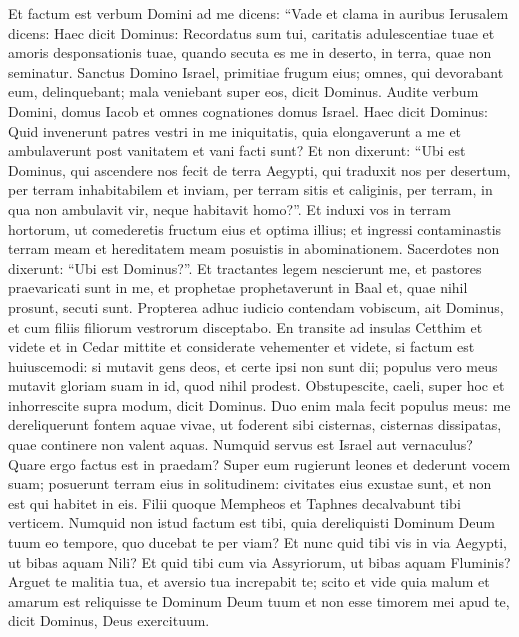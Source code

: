 \begin{biblechapter}  
\verse Et factum est verbum Domini ad me dicens: 
\verse “Vade et clama in auribus Ierusalem dicens: Haec dicit Dominus: Recordatus sum tui, caritatis adulescentiae tuae et amoris desponsationis tuae, quando secuta es me in deserto, in terra, quae non seminatur. 
\verse Sanctus Domino Israel, primitiae frugum eius; omnes, qui devorabant eum, delinquebant; mala veniebant super eos, dicit Dominus. 
\verse Audite verbum Domini, domus Iacob et omnes cognationes domus Israel. 
\verse Haec dicit Dominus: Quid invenerunt patres vestri in me iniquitatis, quia elongaverunt a me et ambulaverunt post vanitatem et vani facti sunt? 
\verse Et non dixerunt: “Ubi est Dominus, qui ascendere nos fecit de terra Aegypti, qui traduxit nos per desertum, per terram inhabitabilem et inviam, per terram sitis et caliginis, per terram, in qua non ambulavit vir, neque habitavit homo?”. 
\verse Et induxi vos in terram hortorum, ut comederetis fructum eius et optima illius; et ingressi contaminastis terram meam et hereditatem meam posuistis in abominationem. 
\verse Sacerdotes non dixerunt: “Ubi est Dominus?”. Et tractantes legem nescierunt me, et pastores praevaricati sunt in me, et prophetae prophetaverunt in Baal et, quae nihil prosunt, secuti sunt. 
\verse Propterea adhuc iudicio contendam vobiscum, ait Dominus, et cum filiis filiorum vestrorum disceptabo. 
\verse En transite ad insulas Cetthim et videte et in Cedar mittite et considerate vehementer et videte, si factum est huiuscemodi: 
\verse si mutavit gens deos, et certe ipsi non sunt dii; populus vero meus mutavit gloriam suam in id, quod nihil prodest. 
\verse Obstupescite, caeli, super hoc et inhorrescite supra modum, dicit Dominus. 
\verse Duo enim mala fecit populus meus: me dereliquerunt fontem aquae vivae, ut foderent sibi cisternas, cisternas dissipatas, quae continere non valent aquas. 
\verse Numquid servus est Israel aut vernaculus? Quare ergo factus est in praedam? Super eum rugierunt leones 
\verse et dederunt vocem suam; posuerunt terram eius in solitudinem: civitates eius exustae sunt, et non est qui habitet in eis. 
\verse Filii quoque Mempheos et Taphnes decalvabunt tibi verticem. 
\verse Numquid non istud factum est tibi, quia dereliquisti Dominum Deum tuum eo tempore, quo ducebat te per viam? 
\verse Et nunc quid tibi vis in via Aegypti, ut bibas aquam Nili? Et quid tibi cum via Assyriorum, ut bibas aquam Fluminis? 
\verse Arguet te malitia tua, et aversio tua increpabit te; scito et vide quia malum et amarum est reliquisse te Dominum Deum tuum et non esse timorem mei apud te, dicit Dominus, Deus exercituum. 

\end{biblechapter}
